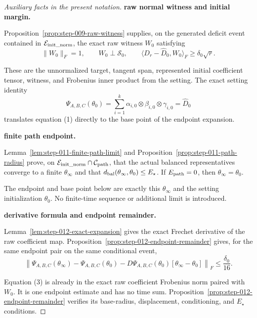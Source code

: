 \begin{proof}[Auxiliary facts in the present notation]


\medskip\noindent\textbf{raw normal witness and initial margin.}\par

Proposition~\ref{prop:step-009-raw-witness} supplies, on the generated deficit
event contained in \(\mathcal E_{\rm init\_norm}\), the exact raw witness
\(W_0\) satisfying
\[
  \|W_0\|_F=1,
  \qquad W_0\perp\mathscr S_0,
  \qquad
  \langle D_r-\widehat D_0,W_0\rangle_F
  \ge\delta_0\sqrt r.
  \tag{1}
\]

These are the unnormalized target,
tangent span, represented initial coefficient tensor, witness, and Frobenius
inner product from the setting. The exact setting identity
\[
  \Psi_{A,B,C}(\theta_0)
  =\sum_{i=1}^k\alpha_{i,0}\otimes\beta_{i,0}\otimes\gamma_{i,0}
  =\widehat D_0                                             \tag{2}
\]
translates equation (1) directly to the base point of the endpoint expansion.


\medskip\noindent\textbf{finite path endpoint.}\par

Lemma~\ref{lem:step-011-finite-path-limit} and
Proposition~\ref{prop:step-011-path-radius} prove, on
\(\mathcal E_{\rm init\_norm}\cap\mathcal C_{\rm path}\), that the actual
balanced representatives converge to a finite \(\theta_\infty\) and that
\(d_{\rm bal}(\theta_\infty,\theta_0)\le E_\star\). If
\(E_{\rm path}=0\), then \(\theta_\infty=\theta_0\).

The endpoint and base point below are
exactly this \(\theta_\infty\) and the setting initialization \(\theta_0\).
No finite-time sequence or additional limit is introduced.


\medskip\noindent\textbf{derivative formula and endpoint remainder.}\par

Lemma~\ref{lem:step-012-exact-expansion} gives the exact Frechet derivative of
the raw coefficient map. Proposition~\ref{prop:step-012-endpoint-remainder} gives, for the same
endpoint pair on the same conditional event,
\[
  \left\|\Psi_{A,B,C}(\theta_\infty)-\Psi_{A,B,C}(\theta_0)
  -D\Psi_{A,B,C}(\theta_0)[\theta_\infty-\theta_0]\right\|_F
  \le\frac{\delta_0}{16}.                                \tag{3}
\]

Equation (3) is already in the exact
raw coefficient Frobenius norm paired with \(W_0\). It is one endpoint
estimate and has no time sum. Proposition~\ref{prop:step-012-endpoint-remainder}
verifies its base-radius, displacement, conditioning, and \(E_\star\)
conditions.



\end{proof}
